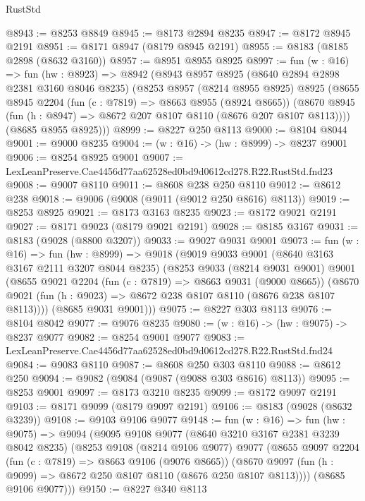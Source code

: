 \begin{lexlean}{RustStd}
\begin{coremodule}
@8943 := @8253 @8849
@8945 := @8173 @2894 @8235
@8947 := @8172 @8945 @2191
@8951 := @8171 @8947 (@8179 @8945 @2191)
@8955 := @8183 (@8185 @2898 (@8632 @3160))
@8957 := @8951 @8955 @8925
@8997 := fun (w : @16) =>
  fun (hw : @8923) =>
  @8942
    (@8943
      @8957
      @8925
      (@8640 @2894 @2898 @2381 @3160 @8046 @8235)
      (@8253
        @8957
        (@8214 @8955 @8925)
        @8925
        (@8655
          @8945
          @2204
          (fun (c : @7819) => @8663 @8955 (@8924 @8665))
          (@8670 @8945 (fun (h : @8947) => @8672 @207 @8107 @8110 (@8676 @207 @8107 @8113))))
        (@8685 @8955 @8925)))
@8999 := @8227 @250 @8113
@9000 := @8104 @8044
@9001 := @9000 @8235
@9004 := (w : @16) -> (hw : @8999) -> @8237 @9001
@9006 := @8254 @8925 @9001
@9007 := LexLeanPreserve.Cae4456d77aa62528ed0bd9d0612cd278.R22.RustStd.fnd23
@9008 := @9007 @8110
@9011 := @8608 @238 @250 @8110
@9012 := @8612 @238
@9018 := @9006 (@9008 (@9011 (@9012 @250 @8616) @8113))
@9019 := @8253 @8925
@9021 := @8173 @3163 @8235
@9023 := @8172 @9021 @2191
@9027 := @8171 @9023 (@8179 @9021 @2191)
@9028 := @8185 @3167
@9031 := @8183 (@9028 (@8800 @3207))
@9033 := @9027 @9031 @9001
@9073 := fun (w : @16) =>
  fun (hw : @8999) =>
  @9018
    (@9019
      @9033
      @9001
      (@8640 @3163 @3167 @2111 @3207 @8044 @8235)
      (@8253
        @9033
        (@8214 @9031 @9001)
        @9001
        (@8655
          @9021
          @2204
          (fun (c : @7819) => @8663 @9031 (@9000 @8665))
          (@8670 @9021 (fun (h : @9023) => @8672 @238 @8107 @8110 (@8676 @238 @8107 @8113))))
        (@8685 @9031 @9001)))
@9075 := @8227 @303 @8113
@9076 := @8104 @8042
@9077 := @9076 @8235
@9080 := (w : @16) -> (hw : @9075) -> @8237 @9077
@9082 := @8254 @9001 @9077
@9083 := LexLeanPreserve.Cae4456d77aa62528ed0bd9d0612cd278.R22.RustStd.fnd24
@9084 := @9083 @8110
@9087 := @8608 @250 @303 @8110
@9088 := @8612 @250
@9094 := @9082 (@9084 (@9087 (@9088 @303 @8616) @8113))
@9095 := @8253 @9001
@9097 := @8173 @3210 @8235
@9099 := @8172 @9097 @2191
@9103 := @8171 @9099 (@8179 @9097 @2191)
@9106 := @8183 (@9028 (@8632 @3239))
@9108 := @9103 @9106 @9077
@9148 := fun (w : @16) =>
  fun (hw : @9075) =>
  @9094
    (@9095
      @9108
      @9077
      (@8640 @3210 @3167 @2381 @3239 @8042 @8235)
      (@8253
        @9108
        (@8214 @9106 @9077)
        @9077
        (@8655
          @9097
          @2204
          (fun (c : @7819) => @8663 @9106 (@9076 @8665))
          (@8670 @9097 (fun (h : @9099) => @8672 @250 @8107 @8110 (@8676 @250 @8107 @8113))))
        (@8685 @9106 @9077)))
@9150 := @8227 @340 @8113

\end{coremodule}
\end{lexlean}
